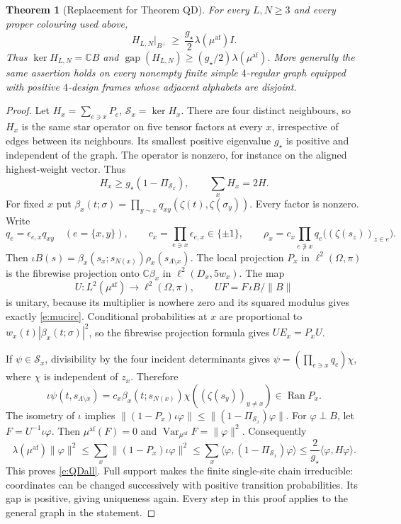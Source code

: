 \documentclass[11pt,reqno]{amsart}
\newtheorem{theorem}{Theorem}[section]
\theoremstyle{definition}
\newcommand{\C}{\mathbb C}
\newcommand{\Var}{\operatorname{Var}}
\newcommand{\gap}{\operatorname{gap}}
\newcommand{\Ran}{\operatorname{Ran}}
\newcommand{\af}{\mathrm{af}}
\begin{document}
\begin{theorem}[Replacement for Theorem QD]\label{t:QD}
For every $L,N\ge3$ and every proper colouring used above,
\begin{equation}\label{e:QDall}
 H_{L,N}\big|_{B^\perp}\ \ge\ \frac{g_\star}{2}
                  \lambda(\mu^{\af}) I.
\end{equation}
Thus $\ker H_{L,N}=\C B$ and
$\gap(H_{L,N})\ge(g_\star/2)\lambda(\mu^{\af})$.
More generally the same assertion holds on every nonempty finite simple
$4$-regular graph equipped with positive $4$-design frames whose
adjacent alphabets are disjoint.
\end{theorem}
\begin{proof}
Let $H_x=\sum_{e\ni x}P_e$, $\mathcal S_x=\ker H_x$.
There are four distinct neighbours, so $H_x$ is the same star operator
on five tensor factors at every $x$, irrespective of edges between its
neighbours. Its smallest positive eigenvalue $g_\star$ is positive and
independent of the graph. The operator is nonzero, for instance on the
aligned highest-weight vector. Thus
\[
 H_x\ge g_\star(1-\Pi_{\mathcal S_x}),\qquad \sum_xH_x=2H.
\]
For fixed $x$ put
$\beta_x(t;\sigma)=\prod_{y\sim x}q_{xy}(\zeta(t),\zeta(\sigma_y))$.
Every factor is nonzero. Write
\begin{equation}\label{e:cx}
 q_e=\epsilon_{e,x}q_{xy}\quad(e=\{x,y\}),\qquad
 c_x=\prod_{e\ni x}\epsilon_{e,x}\in\{\pm1\},\qquad
 \rho_x=c_x\prod_{e\not\ni x}q_e\bigl((\zeta(s_z))_{z\in e}\bigr).
\end{equation}
Then $\iota B(s)=\beta_x(s_x;s_{N(x)})\rho_x(s_{\Lambda\setminus x})$.
The local projection $P_x$ in $\ell^2(\Omega,\pi)$ is the fibrewise
projection onto $\C\beta_x$ in $\ell^2(D_x,5w_x)$.
The map
\[
 U:L^2(\mu^{\af})\longrightarrow\ell^2(\Omega,\pi),\qquad
 UF=F\,\iota B/\|B\|
\]
is unitary, because its multiplier is nowhere zero and its squared
modulus gives exactly \eqref{e:mucirc}. Conditional probabilities at $x$
are proportional to $w_x(t)|\beta_x(t;\sigma)|^2$, so the fibrewise
projection formula gives $UE_x=P_xU$.

If $\psi\in\mathcal S_x$, divisibility by the four incident determinants
gives $\psi=(\prod_{e\ni x}q_e)\chi$, where $\chi$ is independent of
$z_x$. Therefore
\[
 \iota\psi(t,s_{\Lambda\setminus x})
   =c_x\beta_x(t;s_{N(x)})\chi((\zeta(s_y))_{y\ne x})\in\Ran P_x.
\]
The isometry of $\iota$ implies
$\|(1-P_x)\iota\varphi\|\le
  \|(1-\Pi_{\mathcal S_x})\varphi\|$.
For $\varphi\perp B$, let $F=U^{-1}\iota\varphi$. Then
$\mu^{\af}(F)=0$ and $\Var_{\mu^{\af}}F=\|\varphi\|^2$.
Consequently
\[
 \lambda(\mu^{\af})\|\varphi\|^2
 \le\sum_x\|(1-P_x)\iota\varphi\|^2
 \le\sum_x\langle\varphi,(1-\Pi_{\mathcal S_x})\varphi\rangle
 \le\frac2{g_\star}\langle\varphi,H\varphi\rangle.
\]
This proves \eqref{e:QDall}. Full support makes the finite single-site
chain irreducible: coordinates can be changed successively with positive
transition probabilities. Its gap is positive, giving uniqueness again.
Every step in this proof applies to the general graph in the statement.
\end{proof}
\end{document}
